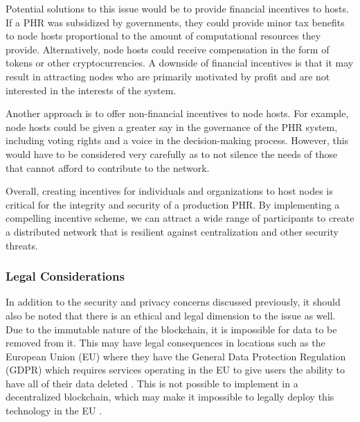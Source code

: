 \documentclass{article}
\begin{document}
Potential solutions to this issue would be to provide financial incentives to hosts. If a PHR was subsidized by governments, they could provide minor tax benefits to node hosts proportional to the amount of computational resources they provide. Alternatively, node hosts could receive compensation in the form of tokens or other cryptocurrencies. A downside of financial incentives is that it may result in attracting nodes who are primarily motivated by profit and are not interested in the interests of the system.

Another approach is to offer non-financial incentives to node hosts. For example, node hosts could be given a greater say in the governance of the PHR system, including voting rights and a voice in the decision-making process. However, this would have to be considered very carefully as to not silence the needs of those that cannot afford to contribute to the network.

Overall, creating incentives for individuals and organizations to host nodes is critical for the integrity and security of a production PHR. By implementing a compelling incentive scheme, we can attract a wide range of participants to create a distributed network that is resilient against centralization and other security threats.  

\subsubsection{Legal Considerations}
In addition to the security and privacy concerns discussed previously, it should also be noted that there is an ethical and legal dimension to the issue as well. Due to the immutable nature of the blockchain, it is impossible for data to be removed from it. This may have legal consequences in locations such as the European Union (EU) where they have the General Data Protection Regulation (GDPR) which requires services operating in the EU to give users the ability to have all of their data deleted \cite{GDPR-Art17}. This is not possible to implement in a decentralized blockchain, which may make it impossible to legally deploy this technology in the EU \cite{info:doi/10.2196/25094}.
\end{document}

